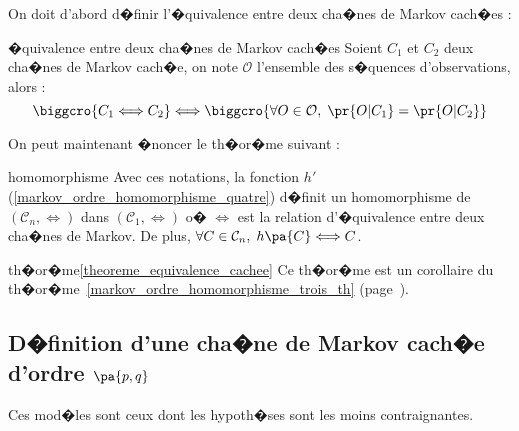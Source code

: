 On doit d'abord d�finir l'�quivalence entre deux cha�nes de Markov cach�es :


        \begin{xdefinition}{�quivalence entre deux cha�nes de Markov cach�es}
        \label{definition_hmm_equivalence}%
        Soient $C_1$ et $C_2$ deux cha�nes de Markov cach�e, on note $\mathcal{O}$ l'ensemble des s�quences 
        d'observations, alors :
                $$
                \biggcro{C_1 \Longleftrightarrow C_2} \Longleftrightarrow \biggcro{\forall O
                \in \mathcal{O}, \; \pr{O|C_1} = \pr{O|C_2}}
                $$
        \end{xdefinition}




On peut maintenant �noncer le th�or�me suivant :


        \begin{xtheorem}{homomorphisme}
        \label{theoreme_equivalence_cachee}%
        Avec ces notations, la fonction $h'$ (\ref{markov_ordre_homomorphisme_quatre}) 
        d�finit un homomorphisme de $\left(\mathcal{C}_{n} ,
         \Longleftrightarrow \right)$ dans $\left( \mathcal{C}_{1},\Longleftrightarrow\right)  $ o� 
         $\Longleftrightarrow$ est la relation
          d'�quivalence entre deux cha�nes de Markov. De plus, $\forall C\in \mathcal{C}_n, \; h\pa{C} 
          \Longleftrightarrow C$.
        \end{xtheorem}


\begin{xdemo}{th�or�me}{\ref{theoreme_equivalence_cachee}}
Ce th�or�me est un corollaire du th�or�me~\ref{markov_ordre_homomorphisme_trois_th} (page~\pageref{markov_ordre_homomorphisme_trois_th}).
\end{xdemo}











\subsection{D�finition d'une cha�ne de Markov cach�e d'ordre $\pa{p,q}$}


Ces mod�les sont ceux dont les hypoth�ses sont les moins contraignantes.


